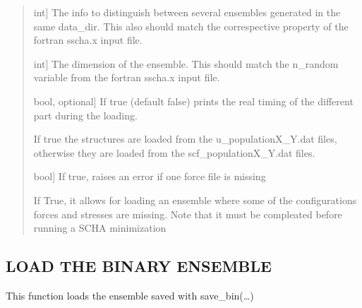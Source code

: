 \documentclass[a4paper,11pt,english]{sphinxmanual}
\begin{document}
\begin{fulllineitems}
\begin{fulllineitems}
\begin{quote}
\begin{description}
\sphinxlineitem{population}{[}int{]}
\sphinxAtStartPar
The info to distinguish between several ensembles generated in the
same data\_dir. This also should match the correspective property
of the fortran sscha.x input file.

\sphinxlineitem{N}{[}int{]}
\sphinxAtStartPar
The dimension of the ensemble. This should match the n\_random
variable from the fortran sscha.x input file.

\sphinxlineitem{verbose}{[}bool, optional{]}
\sphinxAtStartPar
If true (default false) prints the real timing of the different part
during the loading.

\sphinxAtStartPar
If true the structures are loaded from the u\_populationX\_Y.dat files,
otherwise they are loaded from the scf\_populationX\_Y.dat files.

\sphinxlineitem{raise\_error\_on\_not\_found}{[}bool{]}
\sphinxAtStartPar
If true, raises an error if one force file is missing

\sphinxAtStartPar
If True, it allows for loading an ensemble where some of the configurations forces and stresses are missing.
Note that it must be compleated before running a SCHA minimization

\end{description}
\end{quote}

\end{fulllineitems}


\begin{fulllineitems}
\label{\detokenize{apireference:sscha.Ensemble.Ensemble.load_bin}}
\pysigstartsignatures
{}
\pysigstopsignatures

\subsection{LOAD THE BINARY ENSEMBLE}
\label{\detokenize{apireference:load-the-binary-ensemble}}
\sphinxAtStartPar
This function loads the ensemble saved with save\_bin(…)



\end{fulllineitems}
\end{fulllineitems}
\end{document}
